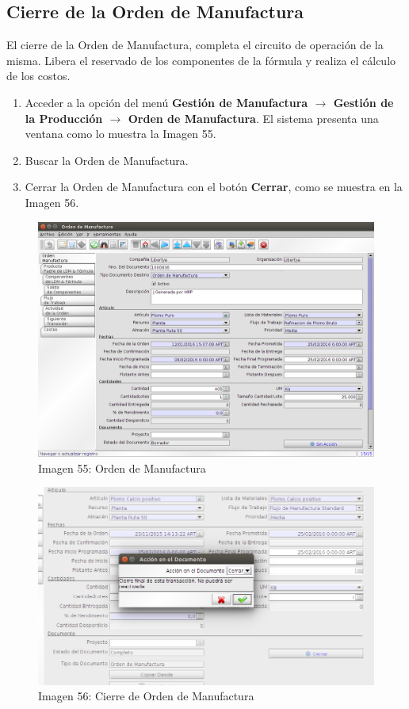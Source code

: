 \documentclass[letterpaper,10pt,spanish]{sphinxmanual}
\begin{document}
\subsection{Cierre de la Orden de Manufactura}
\label{manufactura-operaciones:cierre-de-la-orden-de-manufactura}
El cierre de la Orden de Manufactura, completa el circuito de operación de la misma. Libera el reservado de los componentes de la fórmula y realiza el cálculo de los costos.
\begin{enumerate}
\item {} 
Acceder a la opción del menú \textbf{Gestión de Manufactura \(\rightarrow\)  Gestión de la Producción \(\rightarrow\) Orden de Manufactura}. El sistema presenta una ventana como lo muestra la Imagen 55.

\item {} 
Buscar la Orden de Manufactura.

\item {} 
Cerrar la Orden de Manufactura con el botón \textbf{Cerrar}, como se muestra en la Imagen 56.

\end{enumerate}
\begin{figure}[htbp]
\centering
\capstart

\includegraphics{ly_om_1.png}
\caption{Imagen 55: Orden de Manufactura}\end{figure}
\begin{figure}[htbp]
\centering
\capstart

\includegraphics{ly_om_cierre.png}
\caption{Imagen 56: Cierre de Orden de Manufactura}\end{figure}
\end{document}
